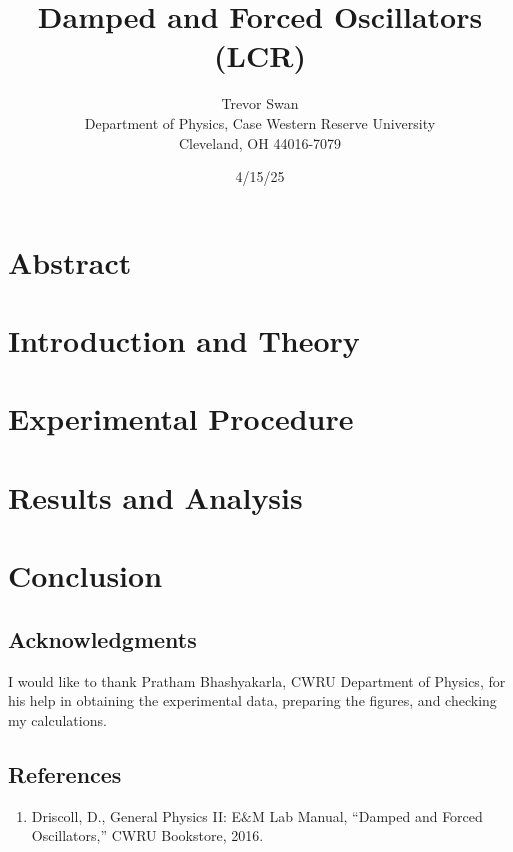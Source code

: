 \documentclass[12pt]{article}
\title{Damped and Forced Oscillators \\ \small (LCR)}
\author{Trevor Swan \\
Department of Physics, Case Western Reserve University \\
Cleveland, OH 44016-7079}
\date{4/15/25}
\begin{document}
\pagestyle{fancy}
\fancyhf{}

\maketitle
\thispagestyle{fancy}
\renewcommand{\headrulewidth}{0pt}

\fancyfoot[C]{\thepage}

\section{Abstract}
\lipsum[1]

\section{Introduction and Theory}
\lipsum[1]

\section{Experimental Procedure}
\lipsum[1]

\section{Results and Analysis}
\lipsum[1]

\section{Conclusion}
\lipsum[1]

\subsection{Acknowledgments}
I would like to thank Pratham Bhashyakarla, CWRU Department of Physics, for his help in obtaining the experimental data, preparing the figures, and checking my calculations.

\subsection{References}
\begin{enumerate}
    \item Driscoll, D., General Physics II: E$\&$M Lab Manual, “Damped and Forced Oscillators,” CWRU Bookstore, 2016.
    \label{ref:MANUEL}
\end{enumerate}
\end{document}
